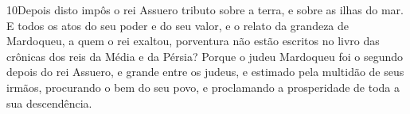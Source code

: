 \medskip

\lettrine{10} Depois disto impôs o rei Assuero tributo sobre a
terra, e sobre as ilhas do mar. E todos os atos do seu poder e
do seu valor, e o relato da grandeza de Mardoqueu, a quem o rei
exaltou, porventura não estão escritos no livro das crônicas dos
reis da Média e da Pérsia? Porque o judeu Mardoqueu foi o
segundo depois do rei Assuero, e grande entre os judeus, e estimado
pela multidão de seus irmãos, procurando o bem do seu povo, e
proclamando a prosperidade de toda a sua descendência.

